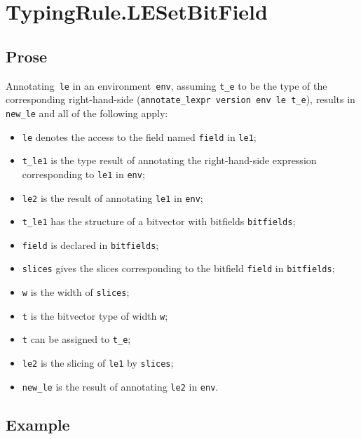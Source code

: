 \documentclass{book}
\begin{document}

\section{TypingRule.LESetBitField \label{sec:TypingRule.LESetBitField}}

    \subsection{Prose}
   Annotating~\texttt{le} in an environment~\texttt{env}, assuming
\texttt{t\_e} to be the type of the corresponding right-hand-side
(\texttt{annotate\_lexpr version env le t\_e}), results in \texttt{new\_le} and
all of the following apply:
   \begin{itemize}
   \item \texttt{le} denotes the access to the field named \texttt{field} in \texttt{le1};
   \item \texttt{t\_le1} is the type result of annotating the right-hand-side expression corresponding to \texttt{le1} in \texttt{env};
   \item \texttt{le2} is the result of annotating \texttt{le1} in \texttt{env};
   \item \texttt{t\_le1} has the structure of a bitvector with bitfields \texttt{bitfields};
   \item \texttt{field} is declared in \texttt{bitfields};
   \item \texttt{slices} gives the slices corresponding to the bitfield \texttt{field} in
      \texttt{bitfields};
   \item \texttt{w} is the width of \texttt{slices};
   \item \texttt{t} is the bitvector type of width \texttt{w};
   \item \texttt{t} can be assigned to \texttt{t\_e};
   \item \texttt{le2} is the slicing of \texttt{le1} by \texttt{slices};
   \item \texttt{new\_le} is the result of annotating \texttt{le2} in \texttt{env}.
   \end{itemize}

  \subsection{Example}
\end{document}
